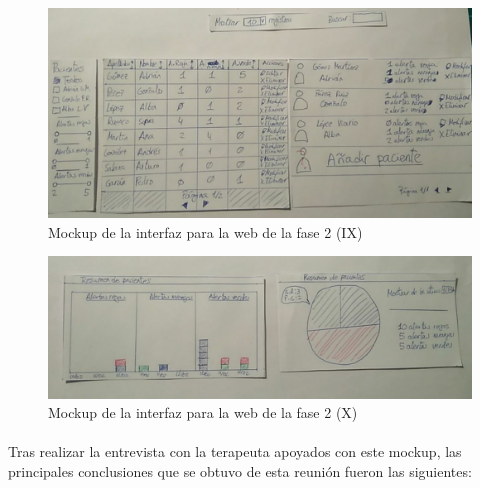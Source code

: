 \begin{figure}[!htbp]
    \centering
    \includegraphics[scale=0.3]{Imagenes/anxA10.jpg}
    \caption[Mockup de la interfaz para la web de la fase 1 (IX)]{Mockup de la interfaz para la web de la fase 2 (IX)}
    \label{fig:mockup10}
\end{figure}

\begin{figure}[!htbp]
    \centering
    \includegraphics[scale=0.3]{Imagenes/anxA11.jpg}
    \caption[Mockup de la interfaz para la web de la fase 1 (X)]{Mockup de la interfaz para la web de la fase 2 (X)}
    \label{fig:mockup11}
\end{figure}

\paragraph{}
Tras realizar la entrevista con la terapeuta apoyados con este mockup, las principales conclusiones que se obtuvo de esta reunión fueron las siguientes:

